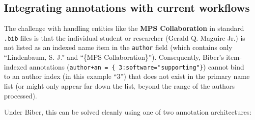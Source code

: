\documentclass[12pt, twoside]{article}
\newcommand{\fname}[1]{\texttt{#1}}
\begin{document}
\subsection{Integrating annotations with current workflows}
\label{sec:integratingAnnotationsWithCurrentWorkflows}

The challenge with handling entities like the \textbf{MPS Collaboration} in standard \fname{.bib} files is that the individual student or researcher (\eg Gerald Q. Maguire Jr.) is not listed as an indexed name item in the \texttt{author} field (which contains only \enquote{Lindenbaum, S. J.} and \enquote{\{MPS Collaboration\}}). Consequently, Biber’s item-indexed annotations (\texttt{author+an = \{ 3:software="supporting"\}}) cannot bind to an author index (in this example \enquote{3}) that does not exist in the primary name list (or might only appear far down the list, \ie beyond the range of the authors processed).

Under Biber, this can be solved cleanly using one of two annotation architectures:
\end{document}
